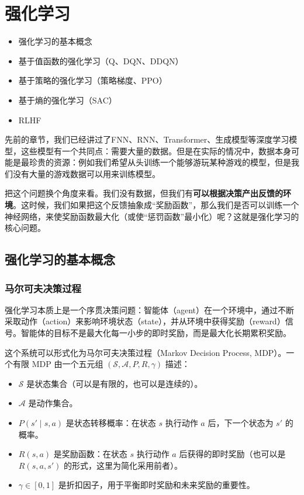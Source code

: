 \chapter{强化学习}

\begin{intro}
\begin{itemize}
    \item 强化学习的基本概念
    \item 基于值函数的强化学习（Q、DQN、DDQN）
    \item 基于策略的强化学习（策略梯度、PPO）
    \item 基于熵的强化学习（SAC）
    \item RLHF
\end{itemize}
\end{intro}

先前的章节，我们已经讲过了FNN、RNN、Transformer、生成模型等深度学习模型，这些模型有一个共同点：需要大量的数据。但是在实际的情况中，数据本身可能是最珍贵的资源：例如我们希望从头训练一个能够游玩某种游戏的模型，但是我们没有大量的游戏数据可以用来训练模型。

把这个问题换个角度来看。我们没有数据，但我们有\textbf{可以根据决策产出反馈的环境}。这时候，我们如果把这个反馈抽象成“奖励函数”，那么我们是否可以训练一个神经网络，来使奖励函数最大化（或使“惩罚函数”最小化）呢？这就是强化学习的核心问题。

\section{强化学习的基本概念}

\subsection{马尔可夫决策过程}

强化学习本质上是一个序贯决策问题：智能体（agent）在一个环境中，通过不断采取动作（action）来影响环境状态（state），并从环境中获得奖励（reward）信号。智能体的目标不是最大化每一小步的即时奖励，而是最大化长期累积奖励。

这个系统可以形式化为马尔可夫决策过程（Markov Decision Process, MDP）。一个有限 MDP 由一个五元组 $(\mathcal{S}, \mathcal{A}, P, R, \gamma)$ 描述：
\begin{itemize}
\item $\mathcal{S}$ 是状态集合（可以是有限的，也可以是连续的）。
\item $\mathcal{A}$ 是动作集合。
\item $P(s' \mid s, a)$ 是状态转移概率：在状态 $s$ 执行动作 $a$ 后，下一个状态为 $s'$ 的概率。
\item $R(s, a)$ 是奖励函数：在状态 $s$ 执行动作 $a$ 后获得的即时奖励（也可以是 $R(s, a, s')$ 的形式，这里为简化采用前者）。
\item $\gamma \in [0,1]$ 是折扣因子，用于平衡即时奖励和未来奖励的重要性。
\end{itemize}

